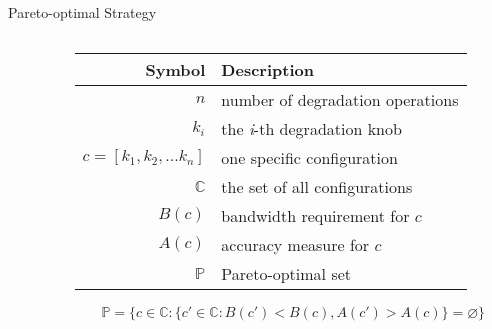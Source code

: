 \begin{frame}{Pareto-optimal Strategy}
  \begin{columns}
    \begin{column}{0.39\textwidth}
      \centering

      \def\points{(0.95, 0.95), (0.93, 0.91), (0.90, 0.91), (0.80, 0.87),
        (0.70, 0.85), (0.64, 0.70), (0.5, 0.66), (0.4, 0.60)}
      
    \end{column}

    \pause

    \begin{column}{0.59\linewidth}
      \scriptsize
      \begin{table}
        \centering
        \begin{tabular}{r l}
          \toprule
          \textbf{Symbol} & \textbf{Description} \\
          \midrule
          $n$ & number of degradation operations \\
          $k_i$ & the \textit{i}-th degradation knob \\
          $c = [k_{1}, k_{2}, ... k_{n}]$ & one specific configuration \\
          $\mathbb{C}$ & the set of all configurations \\
          \midrule
          $B(c)$ & bandwidth requirement for $c$ \\
          $A(c)$ & accuracy measure for $c$ \\
          $\mathbb{P}$ & Pareto-optimal set \\
          \bottomrule
        \end{tabular}
      \end{table}

      \begin{equation*}
        \mathbb{P} = \{ c \in \mathbb{C} : \{ c' \in \mathbb{C}: B(c') < B(c),
        A(c') > A(c) \} = \varnothing\}
      \end{equation*}
    \end{column}
  \end{columns}
\end{frame}

